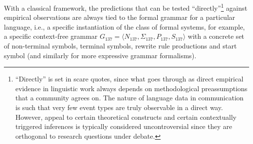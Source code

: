 \documentclass[output=paper,hidelinks]{langscibook}
\begin{document}
\begin{sloppypar}
With a classical framework, the predictions that can be tested ``directly''\footnote{``Directly'' is set in scare quotes, since what goes through as direct empirical evidence in linguistic work always depends on methodological preassumptions that a community agrees on. The nature of language data in communication is such that very few event types are truly observable in a direct way. However, appeal to certain theoretical constructs and certain contextually triggered inferences is typically considered uncontroversial since they are orthogonal to research questions under debate.} against empirical observations are always tied to the formal grammar for a particular language, i.e., a specific instantiation of the class of formal systems, for example, a specific context-free grammar $G_{137} = \langle N_{137}, \Sigma_{137}, P_{137}, S_{137}\rangle$ with a concrete set of non-terminal symbols, terminal symbols, rewrite rule productions and start symbol (and similarly for more expressive grammar formalisms).
\end{sloppypar}
\end{document}
